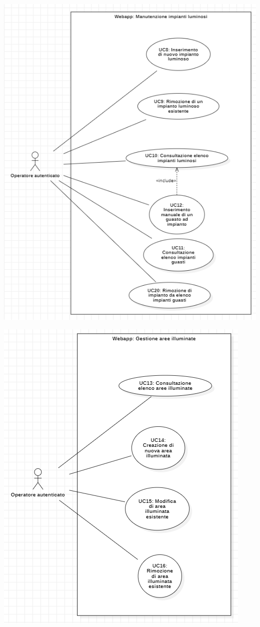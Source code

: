 \documentclass[a4paper, 12pt]{article}
\begin{document}
\includegraphics[scale=0.7]{diagramma_use_case_3.png}

\includegraphics[scale=0.7]{diagramma_use_case_4.png}
\end{document}
